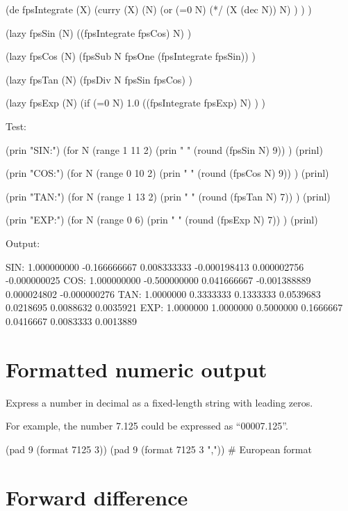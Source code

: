 \begin{wideverbatim}

(de fpsIntegrate (X)
   (curry (X) (N)
      (or
         (=0 N)
         (*/ (X (dec N)) N) ) ) )

(lazy fpsSin (N)
   ((fpsIntegrate fpsCos) N) )

(lazy fpsCos (N)
   (fpsSub N fpsOne (fpsIntegrate fpsSin)) )

(lazy fpsTan (N)
   (fpsDiv N fpsSin fpsCos) )

(lazy fpsExp (N)
   (if (=0 N)
      1.0
      ((fpsIntegrate fpsExp) N) ) )


Test:

(prin "SIN:")
(for N (range 1 11 2)
   (prin " " (round (fpsSin N) 9)) )
(prinl)

(prin "COS:")
(for N (range 0 10 2)
   (prin " " (round (fpsCos N) 9)) )
(prinl)

(prin "TAN:")
(for N (range 1 13 2)
   (prin " " (round (fpsTan N) 7)) )
(prinl)

(prin "EXP:")
(for N (range 0 6)
   (prin " " (round (fpsExp N) 7)) )
(prinl)

Output:

SIN: 1.000000000 -0.166666667 0.008333333 -0.000198413 0.000002756 -0.000000025
COS: 1.000000000 -0.500000000 0.041666667 -0.001388889 0.000024802 -0.000000276
TAN: 1.0000000 0.3333333 0.1333333 0.0539683 0.0218695 0.0088632 0.0035921
EXP: 1.0000000 1.0000000 0.5000000 0.1666667 0.0416667 0.0083333 0.0013889

\end{wideverbatim}

\pagebreak{}
\section*{Formatted numeric output}

Express a number in decimal as a fixed-length string with leading zeros.

For example, the number 7.125 could be expressed as ``00007.125''.

\begin{wideverbatim}

(pad 9 (format 7125 3))
(pad 9 (format 7125 3 ","))  # European format

\end{wideverbatim}

\pagebreak{}
\section*{Forward difference}

